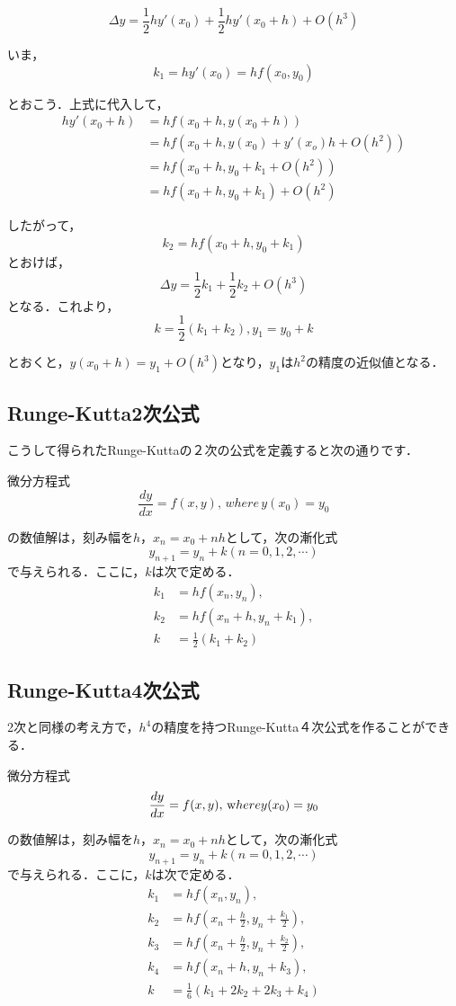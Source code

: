 \documentclass[11pt,dvipdfmx]{jsarticle}
\begin{document}
\[
\Delta y = \frac{1}{2}hy'(x_0) + \frac{1}{2}hy'(x_0+h)+O(h^3)
\]

いま， \[
k_1 =hy'(x_0) =hf(x_0,y_0)
\]

とおこう．上式に代入して， \[
\begin{aligned}
hy'(x_0+h) &= hf(x_0+h,y(x_0+h)) \\
& =hf(x_0+h, y(x_0)+y'(x_o)h+O(h^2)) \\
& =hf(x_0+h, y_0+k_1+O(h^2)) \\
& =hf(x_0+h, y_0+k_1)+O(h^2)
\end{aligned}\]

したがって， \[
k_2 = hf(x_0+h, y_0+k_1)
\] とおけば， \[
\Delta y = \frac{1}{2}k_1 + \frac{1}{2}k_2 + O(h^3)
\] となる．これより， \[
k = \frac{1}{2}(k_1+k_2), y_1 = y_0 +k
\]

とおくと，\(y(x_0+h) = y_1+O(h^3)\)となり，\(y_1\)は\(h^2\)の精度の近似値となる．

    \subsection{Runge-Kutta2次公式}\label{runge-kutta2ux6b21ux516cux5f0f}

こうして得られたRunge-Kuttaの２次の公式を定義すると次の通りです．

微分方程式 \[
\frac{dy}{dx} = f(x,y), \, where \, y(x_0)=y_0
\]

の数値解は，刻み幅を\(h\)，\(x_n=x_0+nh\)として，次の漸化式 \[
y_{n+1} = y_n +k (n=0,1,2,\cdots)
\] で与えられる．ここに，\(k\)は次で定める． \[
\begin{aligned}
k_1 & = hf(x_n,y_n), \\
k_2 & = hf(x_n+h, y_n+k_1), \\
k & = \frac{1}{2}(k_1+k_2)
\end{aligned}
\]

    \subsection{Runge-Kutta4次公式}\label{runge-kutta4ux6b21ux516cux5f0f}

2次と同様の考え方で，\(h^4\)の精度を持つRunge-Kutta４次公式を作ることができる．

微分方程式 \[
\frac{dy}{dx} = f(x,y), \, {\textrm where}y(x_0)=y_0
\]

の数値解は，刻み幅を\(h\)，\(x_n=x_0+nh\)として，次の漸化式 \[
y_{n+1} = y_n +k (n=0,1,2,\cdots)
\] で与えられる．ここに，\(k\)は次で定める． \[
\begin{aligned}
k_1 & = hf(x_n,y_n), \\
k_2 & = hf(x_n+\frac{h}{2}, y_n+\frac{k_1}{2}), \\
k_3 & = hf(x_n+\frac{h}{2}, y_n+\frac{k_2}{2}), \\
k_4 & = hf(x_n+h, y_n+k_3), \\
k & = \frac{1}{6}(k_1+2k_2+2k_3+k_4)
\end{aligned}
\]
\end{document}
